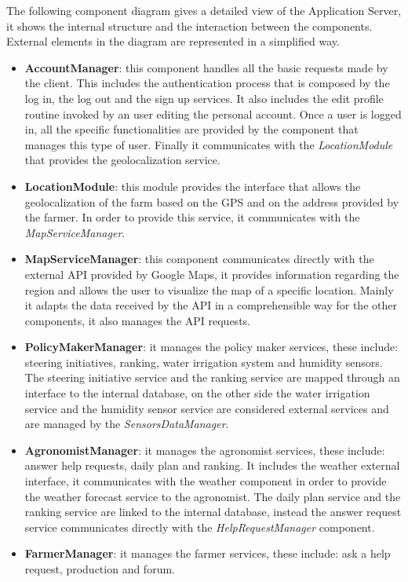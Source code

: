 \documentclass[table, 12pt]{article}
\begin{document}
The following component diagram gives a detailed view of the Application Server, it shows the internal structure and the interaction between the components.
External elements in the diagram are represented in a simplified way.
\begin{itemize}
    \item \textbf{AccountManager}: this component handles all the basic requests made by the client.
    This includes the authentication process that is composed by the log in, the log out and the sign up services. 
    It also includes the edit profile routine invoked by an user editing the personal account.
    Once a user is logged in, all the specific functionalities are provided by the component that manages this type of user.
    Finally it communicates with the \textit{LocationModule} that provides the geolocalization service.
    \item \textbf{LocationModule}: this module provides the interface that allows the geolocalization of the farm based on the GPS and on the address provided by the farmer.
    In order to provide this service, it communicates with the \textit{MapServiceManager}.
    \item \textbf{MapServiceManager}: this component communicates directly with the external API provided by Google Maps, it provides information regarding the region and allows the user to visualize the map of a specific location.
    Mainly it adapts the data received by the API in a comprehensible way for the other components, it also manages the API requests.
    \item \textbf{PolicyMakerManager}: it manages the policy maker services, these include: steering initiatives, ranking, water irrigation system and humidity sensors.
    The steering initiative service and the ranking service are mapped through an interface to the internal database, on the other side the water irrigation service and the humidity sensor service are considered external services and are managed by the \textit{SensorsDataManager}.
    \item \textbf{AgronomistManager}: it manages the agronomist services, these include: answer help requests, daily plan and ranking.
    It includes the weather external interface, it communicates with the weather component in order to provide the weather forecast service to the agronomist.
    The daily plan service and the ranking service are linked to the internal database, instead the answer request service communicates directly with the \textit{HelpRequestManager} component.
    \item \textbf{FarmerManager}: it manages the farmer services, these include: ask a help request, production and forum.

\end{itemize}
\end{document}
